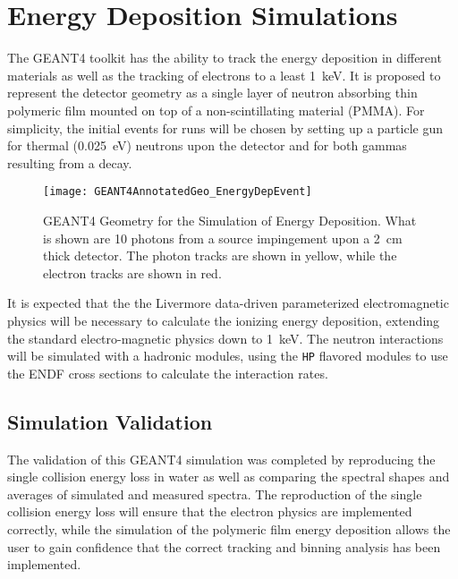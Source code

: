 \section{Energy Deposition Simulations}
\label{sec:EnergyDeposition}
The GEANT4 toolkit has the ability to track the energy deposition in different materials as well as the tracking of electrons to a least \SI{1}{\keV}\cite{agostinelli_geant4simulation_2003}.
It is proposed to represent the detector geometry as a single layer of neutron absorbing thin polymeric film mounted on top of a non-scintillating material (PMMA).
For simplicity, the initial events for runs will be chosen by setting up a particle gun for thermal (\SI{0.025}{\eV}) neutrons upon the detector and for both gammas resulting from a  decay.
\begin{figure}
  \texttt{[image: GEANT4AnnotatedGeo\_EnergyDepEvent]}
	\caption[GEANT4 Energy Deposition Geometry]{GEANT4 Geometry for the Simulation of Energy Deposition. What is shown are 10 photons from a  source impingement upon a \SI{2}{\cm} thick detector.  The photon tracks are shown in yellow, while the electron tracks are shown in red.}
	\label{fig:EDepSimGeo}
\end{figure}
It is expected that the the Livermore data-driven parameterized electromagnetic physics will be necessary to calculate the ionizing energy deposition, extending the standard electro-magnetic physics down to \SI{1}{\kilo\eV}.
The neutron interactions will be simulated with a hadronic modules, using the \verb+HP+ flavored modules to use the ENDF cross sections to calculate the interaction rates.

\subsection{Simulation Validation}
The validation of this GEANT4 simulation was completed by reproducing the single collision energy loss in water as well as comparing  the spectral shapes and averages of simulated and measured spectra.
The reproduction of the single collision energy loss will ensure that the electron physics are implemented correctly, while the simulation of the polymeric film energy deposition allows the user to gain confidence that the correct tracking and binning analysis has been implemented.

